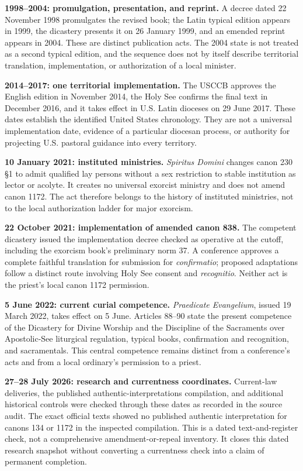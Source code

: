 \medskip\noindent\textbf{1998--2004: promulgation, presentation, and
reprint.}
A decree dated 22 November 1998 promulgates the revised book; the Latin
typical edition appears in 1999, the dicastery presents it on 26 January
1999, and an emended reprint appears in 2004. These are distinct publication
acts. The 2004 state is not treated as a second typical edition, and the
sequence does not by itself describe territorial translation,
implementation, or authorization of a local minister.

\medskip\noindent\textbf{2014--2017: one territorial implementation.}
The USCCB approves the English edition in November 2014, the Holy See confirms
the final text in December 2016, and it takes effect in U.S. Latin dioceses on
29 June 2017. These dates establish the identified United States chronology.
They are not a universal implementation date, evidence of a particular
diocesan process, or authority for projecting U.S. pastoral guidance into
every territory.

\medskip\noindent\textbf{10 January 2021: instituted ministries.}
\emph{Spiritus Domini} changes canon 230 \S1 to admit qualified lay persons
without a sex restriction to stable institution as lector or acolyte. It
creates no universal exorcist ministry and does not amend canon 1172. The act
therefore belongs to the history of instituted ministries, not to the local
authorization ladder for major exorcism.

\medskip\noindent\textbf{22 October 2021: implementation of amended canon
838.}
The competent dicastery issued the implementation decree checked as operative
at the cutoff, including the exorcism book's preliminary norm 37. A conference approves a
complete faithful translation for submission for \emph{confirmatio}; proposed
adaptations follow a distinct route involving Holy See consent and
\emph{recognitio}. Neither act is the priest's local canon 1172 permission.

\medskip\noindent\textbf{5 June 2022: current curial competence.}
\emph{Praedicate Evangelium}, issued 19 March 2022, takes effect on 5 June.
Articles 88--90 state the present competence of the Dicastery for Divine
Worship and the Discipline of the Sacraments over Apostolic-See liturgical
regulation, typical books, confirmation and recognition, and sacramentals.
This central competence remains distinct from a conference's acts and from a
local ordinary's permission to a priest.

\medskip\noindent\textbf{27--28 July 2026: research and currentness
coordinates.}
Current-law deliveries, the published authentic-interpretations compilation,
and additional historical controls were checked through these dates as
recorded in the source audit. The exact official texts showed no published
authentic interpretation for canons 134 or 1172 in the inspected compilation.
This is a dated text-and-register check, not a comprehensive
amendment-or-repeal inventory. It closes this dated research snapshot
without converting a currentness check into a claim of permanent completion.

